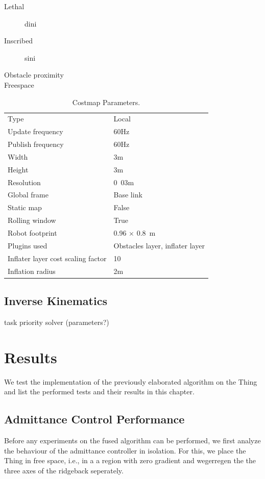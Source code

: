\begin{description}
  \item[Lethal] dini 
  \item[Inscribed] sini
  \item[Obstacle proximity]
  \item[Freespace]
\end{description}

\begin{table}[h]
\begin{center}
 \caption{Costmap Parameters.}\vspace{1ex}
 \label{tab:costmap_params}
 \begin{tabular}{ll}
 \hline
Type & Local \\
Update frequency & \unit{60}{Hz} \\
Publish frequency & \unit{60}{Hz} \\ 
Width & \unit{3}{m} \\
Height & \unit{3}{m} \\
Resolution & \unit{0.03}{m} \\
Global frame & Base link \\
Static map & False \\
Rolling window & True \\
Robot footprint & \unit{0.96 $\times$ 0.8}{m} \\
Plugins used & Obstacles layer, inflater layer \\
Inflater layer cost scaling factor & 10  \\
Inflation radius & \unit{2}{m} \\
 \hline
 \end{tabular}
\end{center}
\end{table}

\section{Inverse Kinematics}
task priority solver (parameters?)
\chapter{Results}
We test the implementation of the previously elaborated algorithm on the Thing and list the performed tests and their results in this chapter.
\section{Admittance Control Performance}
Before any experiments on the fused algorithm can be performed, we first analyze the behaviour of the admittance controller in isolation. For this, we place the Thing in free space, i.e., in a a region with zero gradient and wegerregen the the three axes of the ridgeback seperately.

